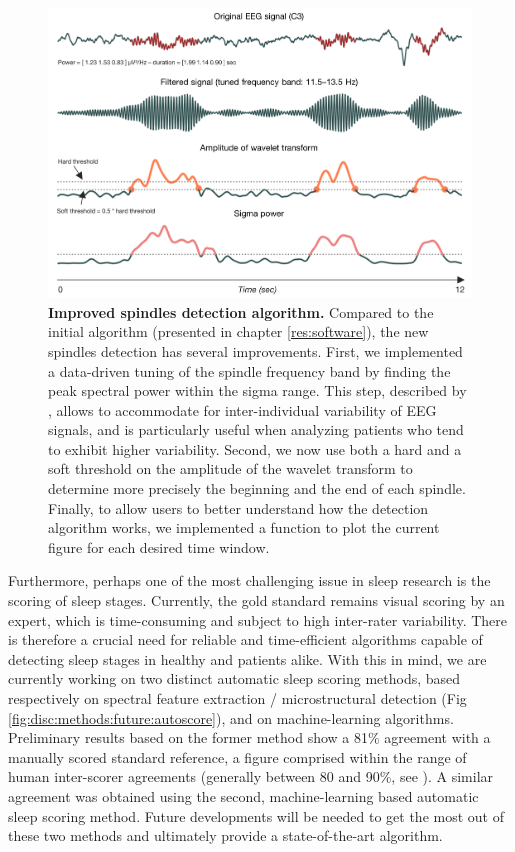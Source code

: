 \begin{figure}[htb]
	\includegraphics[width=\textwidth]{Fig/Discussion/spindles.png}
	\caption[Improved spindles detection algorithm]{\textbf{Improved spindles detection algorithm.} Compared to the initial algorithm (presented in chapter \ref{res:software}), the new spindles detection has several improvements. First, we implemented a data-driven tuning of the spindle frequency band by finding the peak spectral power within the sigma range. This step, described by \citet{berthomier_automatic_2007}, allows to accommodate for inter-individual variability of EEG signals, and is particularly useful when analyzing patients who tend to exhibit higher variability. Second, we now use both a hard and a soft threshold on the amplitude of the wavelet transform to determine more precisely the beginning and the end of each spindle. Finally, to allow users to better understand how the detection algorithm works, we implemented a function to plot the current figure for each desired time window.}
	\label{fig:disc:methods:future:spindles}
\end{figure}

Furthermore, perhaps one of the most challenging issue in sleep research is the scoring of sleep stages. Currently, the gold standard remains visual scoring by an expert, which is time-consuming and subject to high inter-rater variability. There is therefore a crucial need for reliable and time-efficient algorithms capable of detecting sleep stages in healthy and patients alike. With this in mind, we are currently working on two distinct automatic sleep scoring methods, based respectively on spectral feature extraction / microstructural detection (Fig \ref{fig:disc:methods:future:autoscore}), and on machine-learning algorithms. Preliminary results based on the former method show a 81\% agreement with a manually scored standard reference, a figure comprised within the range of human inter-scorer agreements (generally between 80 and 90\%, see \citealp{silber_visual_2007}). A similar agreement was obtained using the second, machine-learning based automatic sleep scoring method. Future developments will be needed to get the most out of these two methods and ultimately provide a state-of-the-art algorithm.

